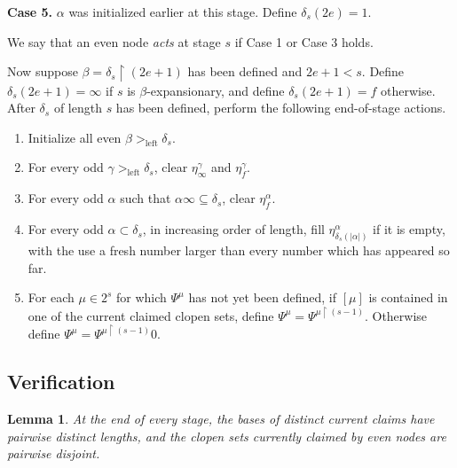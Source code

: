 \documentclass[11pt]{amsart}
\newtheorem{lemma}[theorem]{Lemma}
\begin{document}
\textbf{Case 5.}  $\alpha$ was initialized earlier at this stage.  Define
$\delta_s(2e)=1$.

We say that an even node \emph{acts} at stage $s$ if Case 1 or Case 3 holds.

Now suppose $\beta=\delta_s\upharpoonright(2e+1)$ has been defined and
$2e+1<s$.  Define $\delta_s(2e+1)=\infty$ if $s$ is
$\beta$-expansionary, and define $\delta_s(2e+1)=f$ otherwise.
After $\delta_s$ of length $s$ has been defined, perform the following end-of-stage actions.

\begin{enumerate}[label=(\roman*)]
\item Initialize all even $\beta>_{\mathrm{left}}\delta_s$.
\item For every odd $\gamma>_{\mathrm{left}}\delta_s$, clear
      $\eta_\infty^\gamma$ and $\eta_f^\gamma$.
\item For every odd $\alpha$ such that $\alpha\infty\subseteq\delta_s$, clear $\eta_f^\alpha$.
\item For every odd $\alpha\subset\delta_s$, in increasing order of length,
      fill $\eta_{\delta_s(|\alpha|)}^\alpha$ if it is empty, with the use a fresh
      number larger than every number which has appeared so far.
\item For each $\mu\in2^s$ for which $\Psi^\mu$ has not yet been defined, if
      $[\mu]$ is contained in one of the current claimed clopen sets, define $\Psi^\mu=\Psi^{\mu\upharpoonright(s-1)}$. Otherwise define $\Psi^\mu=\Psi^{\mu\upharpoonright(s-1)}0$.
    
\end{enumerate}

\subsection{Verification}

\begin{lemma}\label{claims-antichain-main}
At the end of every stage, the bases of distinct current claims have pairwise
distinct lengths, and the clopen sets currently claimed by even nodes are pairwise
disjoint.
\end{lemma}
\end{document}
